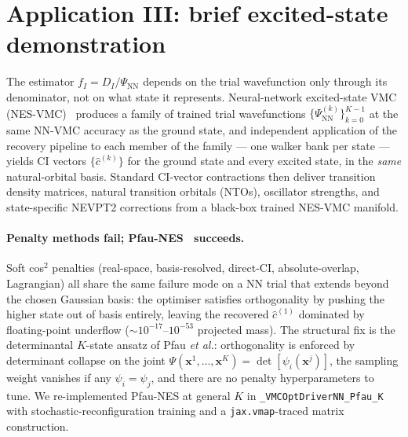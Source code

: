 \documentclass[journal=jctcce,manuscript=article,layout=traditional]{achemso}
\begin{document}
\section{Application III: brief excited-state demonstration}
\label{sec:excited_states_apps_main}

The estimator $f_I = D_I / \Psi_{\mathrm{NN}}$ depends on the trial
wavefunction only through its denominator, not on what state it
represents. Neural-network excited-state VMC
(NES-VMC)~\cite{Pfau2024ExcitedStates} produces a family of trained
trial wavefunctions $\{\Psi_{\mathrm{NN}}^{(k)}\}_{k=0}^{K-1}$ at the
same NN-VMC accuracy as the ground state, and independent application
of the recovery pipeline to each member of the family --- one walker
bank per state --- yields CI vectors $\{\widehat{c}^{(k)}\}$ for the
ground state and every excited state, in the \emph{same}
natural-orbital basis. Standard CI-vector contractions then deliver
transition density matrices, natural transition orbitals (NTOs),
oscillator strengths, and state-specific NEVPT2 corrections from a
black-box trained NES-VMC manifold.

\paragraph{Penalty methods fail; Pfau-NES~\cite{Pfau2024ExcitedStates}
succeeds.}
Soft cos$^2$ penalties (real-space, basis-resolved, direct-CI,
absolute-overlap, Lagrangian) all share the same failure mode on a
NN trial that extends beyond the chosen Gaussian basis: the
optimiser satisfies orthogonality by pushing the higher state
out of basis entirely, leaving the recovered $\widehat c^{(1)}$
dominated by floating-point underflow ($\sim 10^{-17}$--$10^{-53}$
projected mass). The structural fix is the determinantal
$K$-state ansatz of Pfau \emph{et al.}: orthogonality is
enforced by determinant collapse on the joint
$\Psi(\mathbf{x}^1,\dots,\mathbf{x}^K) = \det[\psi_i(\mathbf{x}^j)]$,
the sampling weight vanishes if any $\psi_i = \psi_j$, and there
are no penalty hyperparameters to tune. We re-implemented Pfau-NES
at general $K$ in \texttt{\_VMCOptDriverNN\_Pfau\_K} with
stochastic-reconfiguration training and a \texttt{jax.vmap}-traced
matrix construction.
\end{document}
